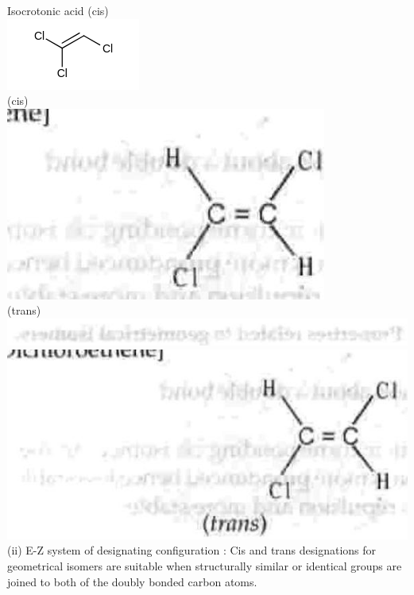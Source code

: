 \documentclass[10pt]{article}
\begin{document}
Isocrotonic acid (cis)\\
\includegraphics{smile-015426c27ea8f41dd8dee8bc6b5c3ba500c6530f}\\
(cis)\\
\includegraphics[max width=\textwidth, center]{2025_01_28_8470952b98110cec3aabg-045(4)}\\
(trans)\\
\includegraphics[max width=\textwidth, center]{2025_01_28_8470952b98110cec3aabg-045(6)}\\
\includegraphics[max width=\textwidth, center]{2025_01_28_8470952b98110cec3aabg-045(5)}\\
(ii) E-Z system of designating configuration : Cis and trans designations for geometrical isomers are suitable when structurally similar or identical groups are joined to both of the doubly bonded carbon atoms.\\
\end{document}
